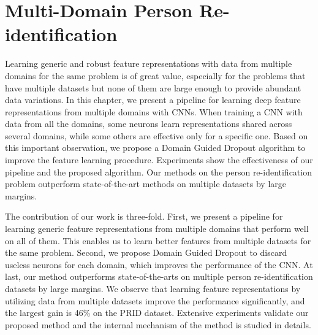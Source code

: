 \chapter{Multi-Domain Person Re-identification}
\label{ch:multi-domain}


Learning generic and robust feature representations with data from multiple domains for the same problem is of great value, especially for the problems that have multiple datasets but none of them are large enough to provide abundant data variations. In this chapter, we present a pipeline for learning deep feature representations from multiple domains with CNNs. When training a CNN with data from all the domains, some neurons learn representations shared across several domains, while some others are effective only for a specific one. Based on this important observation, we propose a Domain Guided Dropout algorithm to improve the feature learning procedure. Experiments show the effectiveness of our pipeline and the proposed algorithm. Our methods on the person re-identification problem outperform state-of-the-art methods on multiple datasets by large margins.

The contribution of our work is three-fold. First, we present a pipeline for learning generic feature representations from multiple domains that perform well on all of them. This enables us to learn better features from multiple datasets for the same problem. Second, we propose Domain Guided Dropout to discard useless neurons for each domain, which improves the performance of the CNN. At last, our method outperforms state-of-the-arts on multiple person re-identification datasets by large margins. We observe that learning feature representations by utilizing data from multiple datasets improve the performance significantly, and the largest gain is 46\% on the PRID dataset. Extensive experiments validate our proposed method and the internal mechanism of the method is studied in details.

